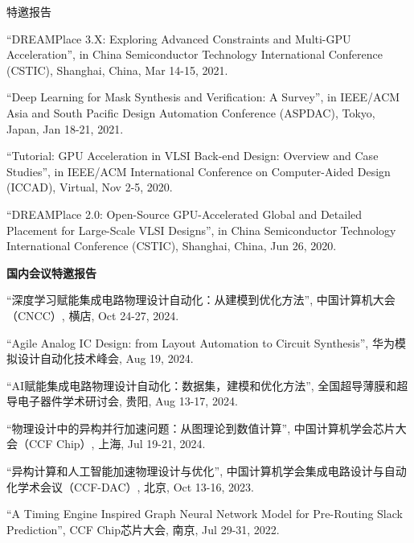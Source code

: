 \begin{rSection}{特邀报告}
\begin{description}[font=\normalfont]
\item[{[4]}]{
``DREAMPlace 3.X: Exploring Advanced Constraints and Multi-GPU Acceleration'', in China Semiconductor Technology International Conference (CSTIC), Shanghai, China, Mar 14-15, 2021. 
}

\item[{[3]}]{
``Deep Learning for Mask Synthesis and Verification: A Survey'', in IEEE/ACM Asia and South Pacific Design Automation Conference (ASPDAC), Tokyo, Japan, Jan 18-21, 2021.
}

\item[{[2]}]{
``Tutorial: GPU Acceleration in VLSI Back-end Design: Overview and Case Studies'', in IEEE/ACM International Conference on Computer-Aided Design (ICCAD), Virtual, Nov 2-5, 2020. 
}

\item[{[1]}]{
``DREAMPlace 2.0: Open-Source GPU-Accelerated Global and Detailed Placement for Large-Scale VLSI Designs'', in China Semiconductor Technology International Conference (CSTIC), Shanghai, China, Jun 26, 2020. 
}

\end{description}

\textbf{国内会议特邀报告}
        
\begin{description}[font=\normalfont]

\item[{[12]}]{
``深度学习赋能集成电路物理设计自动化：从建模到优化方法'', 中国计算机大会（CNCC）, 横店, Oct 24-27, 2024. 
}

\item[{[11]}]{
``Agile Analog IC Design: from Layout Automation to Circuit Synthesis'', 华为模拟设计自动化技术峰会, Aug 19, 2024. 
}

\item[{[10]}]{
``AI赋能集成电路物理设计自动化：数据集，建模和优化方法'', 全国超导薄膜和超导电子器件学术研讨会, 贵阳, Aug 13-17, 2024. 
}

\item[{[9]}]{
``物理设计中的异构并行加速问题：从图理论到数值计算'', 中国计算机学会芯片大会（CCF Chip）, 上海, Jul 19-21, 2024. 
}

\item[{[8]}]{
``异构计算和人工智能加速物理设计与优化'', 中国计算机学会集成电路设计与自动化学术会议（CCF-DAC）, 北京, Oct 13-16, 2023. 
}

\item[{[7]}]{
``A Timing Engine Inspired Graph Neural Network Model for Pre-Routing Slack Prediction'', CCF Chip芯片大会, 南京, Jul 29-31, 2022. 
}


\end{description}
\end{rSection}
